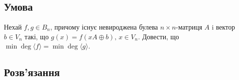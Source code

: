 \chapter{}
\label{chap:1}

\section{Умова}

Нехай $f, g \in B_{n}$, причому існує невироджена булева $n \times n$-матриця $A$ i вектор $b \in V_{n}$
такі, що $g(x) = f(xA \oplus b), \, x \in V_{n}$. Довести, що $\min \deg \langle f \rangle = \min \deg \langle g \rangle$.

\section{Розв'язання}

